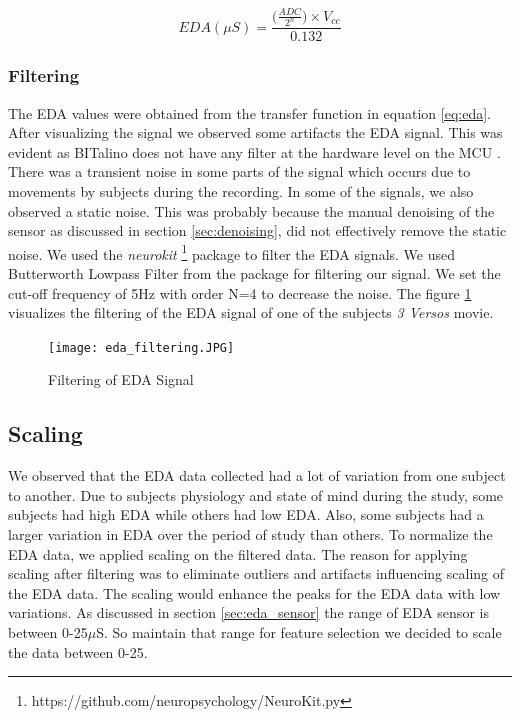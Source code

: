 \begin{equation}
\label{eq:eda}
    EDA(\mu S) = \frac{\big(\frac{ADC}{2^n}) \times V_{cc}}{0.132}
\end{equation}

\subsubsection{Filtering} The EDA values were obtained from the transfer function in equation \ref{eq:eda}. After visualizing the signal we observed some artifacts the EDA signal. This was evident as BITalino does not have any filter at the hardware level on the MCU \cite{noauthor_faq_nodate}. There was a transient noise in some parts of the signal which occurs due to movements by subjects during the recording. In some of the signals, we also observed a static noise. This was probably because the manual denoising of the sensor as discussed in section \ref{sec:denoising}, did not effectively remove the static noise. We used the \textit{neurokit} \footnote{https://github.com/neuropsychology/NeuroKit.py} package to filter the EDA signals. We used Butterworth Lowpass Filter from the package for filtering our signal. We set the cut-off frequency of 5Hz with order N=4 to decrease the noise. The figure \ref{fig:eda_filtering_} visualizes the filtering of the EDA signal of one of the subjects \textit{3 Versos} movie.

\begin{figure}
    \centering
    \texttt{[image: eda\_filtering.JPG]}
    \caption{Filtering of EDA Signal}
    \label{fig:eda_filtering_}
\end{figure}

\subsection{Scaling}
\label{sec:eda_scaling}
We observed that the EDA data collected had a lot of variation from one subject to another. Due to subjects physiology and state of mind during the study, some subjects had high EDA while others had low EDA. Also, some subjects had a larger variation in EDA over the period of study than others. To normalize the EDA data, we applied scaling on the filtered data. The reason for applying scaling after filtering was to eliminate outliers and artifacts influencing scaling of the EDA data. The scaling would enhance the peaks for the EDA data with low variations. As discussed in section \ref{sec:eda_sensor} the range of EDA sensor is between 0-25$\mu$S. So maintain that range for feature selection we decided to scale the data between 0-25.
